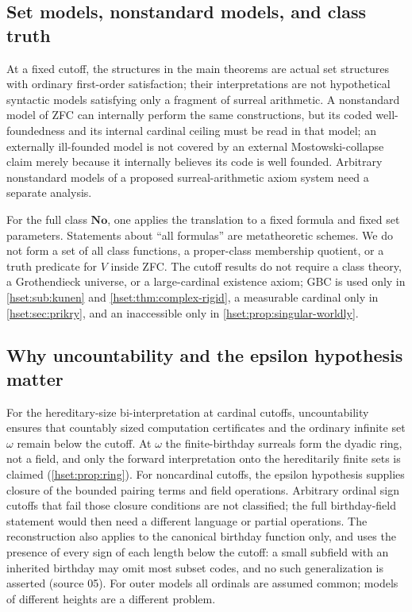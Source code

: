 \documentclass[11pt,letterpaper]{article}
\theoremstyle{definition}
\theoremstyle{remark}
\newcommand{\No}{\mathbf{No}}
\begin{document}
\subsection{Set models, nonstandard models, and class truth}

At a fixed cutoff, the structures in the main theorems are actual set
structures with ordinary first-order satisfaction; their interpretations are not
hypothetical syntactic models satisfying only a fragment of surreal arithmetic.
A nonstandard model of ZFC can internally perform the same constructions, but
its coded well-foundedness and its internal cardinal ceiling must be read in that
model; an externally ill-founded model is not covered by an external
Mostowski-collapse claim merely because it internally believes its code is well
founded. Arbitrary nonstandard models of a proposed surreal-arithmetic axiom
system need a separate analysis.

For the full class $\No$, one applies the translation to a fixed formula and
fixed set parameters. Statements about ``all formulas'' are metatheoretic
schemes. We do not form a set of all class functions, a proper-class membership
quotient, or a truth predicate for $V$ inside ZFC. The cutoff results do not
require a class theory, a Grothendieck universe, or a large-cardinal existence
axiom; GBC is used only in \cref{hset:sub:kunen} and
\cref{hset:thm:complex-rigid}, a measurable cardinal only in
\cref{hset:sec:prikry}, and an inaccessible only in
\cref{hset:prop:singular-worldly}.

\subsection{Why uncountability and the epsilon hypothesis matter}

For the hereditary-size bi-interpretation at cardinal cutoffs, uncountability
ensures that countably sized computation certificates and the ordinary infinite
set $\omega$ remain below the cutoff. At $\omega$ the finite-birthday surreals
form the dyadic ring, not a field, and only the forward interpretation onto the
hereditarily finite sets is claimed (\cref{hset:prop:ring}). For noncardinal
cutoffs, the epsilon hypothesis supplies closure of the bounded pairing terms
and field operations. Arbitrary ordinal sign cutoffs that fail those closure
conditions are not classified; the full birthday-field statement would then need
a different language or partial operations. The reconstruction also applies to
the canonical birthday function only, and uses the presence of every sign of
each length below the cutoff: a small subfield with an inherited birthday may
omit most subset codes, and no such generalization is asserted (source 05). For
outer models all ordinals are assumed common; models of different heights are a
different problem.
\end{document}
